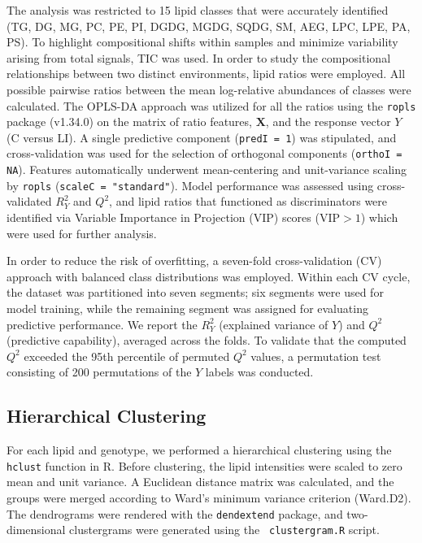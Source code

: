 \documentclass[10pt,letterpaper]{article}
\begin{document}
The analysis was restricted to 15 lipid classes that were accurately identified (TG, DG, MG, PC, PE, PI, DGDG, MGDG, SQDG, SM, AEG, LPC, LPE, PA, PS). To highlight compositional shifts within samples and minimize variability arising from total signals, TIC was used. In order to study the compositional relationships between two distinct environments, lipid ratios were employed. All possible pairwise ratios between the mean log-relative abundances of classes were calculated. The OPLS-DA approach was utilized for all the ratios using the \texttt{ropls} package (v1.34.0) on the matrix of ratio features, \(\mathbf{X}\), and the response vector \(Y\) (C versus LI). A single predictive component (\texttt{predI = 1}) was stipulated, and cross-validation was used for the selection of orthogonal components (\texttt{orthoI = NA}). Features automatically underwent mean-centering and unit-variance scaling by \texttt{ropls} (\texttt{scaleC = "standard"}). Model performance was assessed using cross-validated \(R^{2}_{Y}\) and \(Q^{2}\), and lipid ratios that functioned as discriminators were identified via Variable Importance in Projection (VIP) scores (\(\text{VIP} > 1\)) which were used for further analysis. 

In order to reduce the risk of overfitting, a seven-fold cross-validation (CV) approach with balanced class distributions was employed. Within each CV cycle, the dataset was partitioned into seven segments; six segments were used for model training, while the remaining segment was assigned for evaluating predictive performance. We report the \(R^{2}_{Y}\) (explained variance of \(Y\)) and \(Q^{2}\) (predictive capability), averaged across the folds. To validate that the computed \(Q^{2}\) exceeded the 95th percentile of permuted \(Q^{2}\) values, a permutation test consisting of 200 permutations of the \(Y\) labels was conducted.


\subsection*{Hierarchical Clustering}
For each lipid and genotype, we performed a hierarchical clustering using the \texttt{hclust} function in R.  Before clustering, the lipid intensities were scaled to zero mean and unit variance.  A Euclidean distance matrix was calculated, and the groups were merged according to Ward's minimum variance criterion (Ward.D2).  The dendrograms were rendered with the \texttt{dendextend} package, and two-dimensional clustergrams were generated using the \texttt{ clustergram.R} script.  
\end{document}
